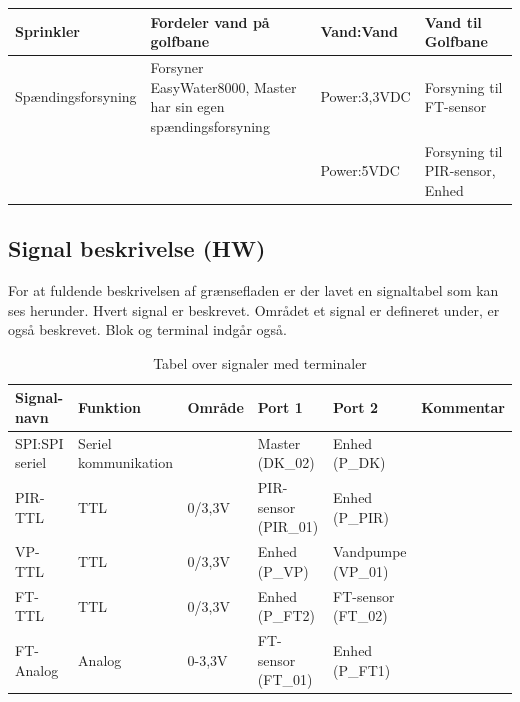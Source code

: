 \begin{table}[H]
\begin{small}
\begin{tabular}{|p{}|p{}|p{}|p{}|}
Sprinkler & Fordeler vand på golfbane & Vand:Vand & Vand til Golfbane \\ \hline

Spændingsforsyning & Forsyner EasyWater8000, Master har sin egen spændingsforsyning & Power:3,3VDC & Forsyning til FT-sensor \\ \cline{3-4}
& & Power:5VDC 		& Forsyning til PIR-sensor, Enhed 	\\ \hline
\end{tabular}
\end{small}
\label{table:Bloktabel}
\end{table}

\begin{table}[H]
\subsection{Signal beskrivelse (HW)}
For at fuldende beskrivelsen af grænsefladen er der lavet en signaltabel som kan ses herunder. Hvert signal er beskrevet. Området et signal er defineret under, er også beskrevet. Blok og terminal indgår også. 
\caption{Tabel over signaler med terminaler}
\begin{small}
\begin{tabular}{|p{2cm}|p{2cm}|p{2cm}|p{2cm}|p{2cm}|p{}|}
\hline

\textbf{Signal-navn}	&\textbf{Funktion} 		&\textbf{Område} &\textbf{Port 1} 	&\textbf{Port 2} 			&\textbf{Kommentar} \\ \hline

SPI:SPI seriel 					&Seriel kommunikation 	& 				&Master (DK\_02)		&Enhed (P\_DK)			&					 \\\hline

PIR-TTL 					&TTL 					&0\slash3,3V 	&PIR-sensor (PIR\_01) &Enhed (P\_PIR)			&					\\\hline
VP-TTL 					&TTL 					&0\slash3,3V 	&Enhed (P\_VP)  &Vandpumpe (VP\_01)		&					\\\hline
		
					
FT-TTL				&TTL					&0\slash3,3V 			&Enhed (P\_FT2) &FT-sensor (FT\_02)				&	    				\\\hline
FT-Analog				&Analog 					&0-3,3V 			&FT-sensor (FT\_01) &Enhed (P\_FT1)				&	    				\\\hline

\end{tabular}
\end{small}
\label{table:Signaltabel}
\end{table}

